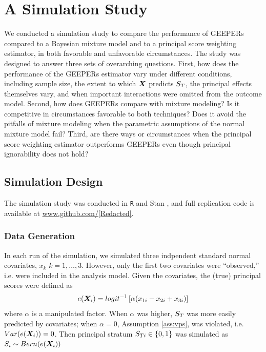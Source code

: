 \documentclass{statsoc} %
\begin{document}
\section{A Simulation Study}\label{sec:simulation}

We conducted a simulation study to compare the performance of GEEPERs compared to a Bayesian mixture model and to a principal score weighting estimator, in both favorable and unfavorable circumstances.
The study was designed to answer three sets of overarching questions.
First, how does the performance of the GEEPERs estimator vary under different conditions, including sample size, the extent to which $\bm{X}$ predicts $S_T$, the principal effects themselves vary, and when important interactions were omitted from the outcome model.
Second, how does GEEPERs compare with mixture modeling? Is it competitive in circumstances favorable to both techniques? Does it avoid the pitfalls of mixture modeling when the parametric assumptions of the normal mixture model fail?
Third, are there ways or circumstances when the principal score weighting estimator outperforms GEEPERs even though principal ignorability does not hold?



\subsection{Simulation Design}
The simulation study was conducted in \texttt{R} \citep{rcite} and Stan \citep{rstan}, and full replication code is available at \url{www.github.com/[Redacted]}.
\subsubsection{Data Generation}

In each run of the simulation, we simulated three indpendent standard normal covariates, $x_k$ $k=1,\dots,3$. However, only the first two covariates were ``observed,'' i.e. were included in the analysis model.
Given the covariates, the (true) principal scores were defined as
\begin{equation*}
  e(\bm{X}_i)=logit^{-1}\left[\alpha(x_{1i}-x_{2i}+x_{3i})\right]
\end{equation*}
where $\alpha$ is a manipulated factor.
When $\alpha$ was higher, $S_T$ was more easily predicted by covariates; when $\alpha=0$, Assumption \ref{ass:vps}, was violated, i.e. $Var(e(\bm{X}_i))=0$.
Then principal stratum $S_{Ti}\in \{0,1\}$ was simulated as $S_i\sim Bern(e(\bm{X}_i))$
\end{document}
